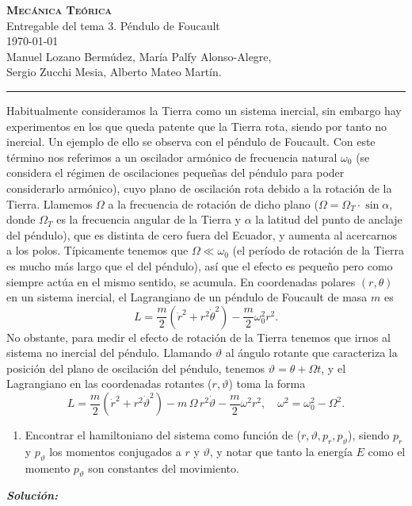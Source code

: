 \documentclass{article}
\begin{document}
\begin{center}
   \HUGE\textbf{ \scshape Mecánica Teórica}  \\ \huge Entregable del tema 3. Péndulo de Foucault \\ \vspace{0.5cm}\today \\
   \vspace{0.7cm}
   \large Manuel Lozano Bermúdez, María Palfy Alonso-Alegre, \\ Sergio Zucchi Mesia,  Alberto Mateo Martín.\\ \rule{\textwidth}{2pt} 
\end{center}

\begin{mybox}
    Habitualmente consideramos la Tierra como un sistema inercial, sin embargo hay experimentos en los que queda patente que la Tierra rota, siendo por tanto no inercial. Un ejemplo de ello se observa con el péndulo de Foucault. Con este término nos referimos a un oscilador armónico de frecuencia natural $\omega_0$ (se considera el régimen de oscilaciones pequeñas del péndulo para poder considerarlo armónico), cuyo plano de oscilación rota debido a la rotación de la Tierra. Llamemos $\Omega$ a la frecuencia de rotación de dicho plano ($\Omega=\Omega_T \cdot \sin\alpha$, donde $\Omega_T$ es la frecuencia angular de la Tierra y $\alpha$ la latitud del punto de anclaje del péndulo), que es distinta de cero fuera del Ecuador, y aumenta al acercarnos a los polos. Típicamente tenemos que $\Omega \ll \omega_0$ (el período de rotación de la Tierra es mucho más largo que el del péndulo), así que el efecto es pequeño pero como siempre actúa en el mismo sentido, se acumula. En coordenadas polares $(r,\theta)$ en un sistema inercial, el Lagrangiano de un péndulo de Foucault de masa $m$ es 
    $$
    L = \frac{m}{2} (\dot{r}^2 + r^2 \dot{\theta}^2) - \frac{m}{2} \omega_0^2 r^2. 
    $$
    No obstante, para medir el efecto de rotación de la Tierra tenemos que irnos al sistema no inercial del péndulo. Llamando $\vartheta$ al ángulo rotante que caracteriza la posición del plano de oscilación del péndulo, tenemos $\vartheta=\theta+\Omega t$, y el Lagrangiano en las coordenadas rotantes ($r,\vartheta$) toma la forma 
    $$
    L = \frac{m}{2} (\dot{r}^2 + r^2 \dot{\vartheta}^2) - m \, \Omega \, r^2 \dot{\vartheta} - \frac{m}{2} \omega^2 r^2, \quad \omega^2 = \omega_0^2 - \Omega^2. $$
\end{mybox}

\begin{mybox}
    \begin{enumerate}
        \item Encontrar el hamiltoniano del sistema como función de ($r,\vartheta,p_r,p_\vartheta$), siendo $p_r$ y $p_\vartheta$ los momentos conjugados a $r$ y $\vartheta$, y notar que tanto la energía $E$ como el momento $p_\vartheta$ son constantes del movimiento.
    \end{enumerate}
\end{mybox}
\emph{\bfseries Solución:} \\
\end{document}
